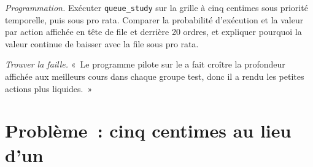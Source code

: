 \begin{exercise}[$\star\star\star$]\label{exo:mx:tick-size-queues-and-priority:7}
\emph{Programmation.} Exécuter \texttt{queue\_study} sur la grille à cinq centimes sous priorité temporelle, puis sous pro rata. Comparer la probabilité d'exécution et la valeur par
action affichée en tête de file et derrière 20 ordres, et expliquer pourquoi la valeur continue de baisser avec la file sous pro rata.
\end{exercise}

\begin{exercise}[$\star\star\star$]\label{exo:mx:tick-size-queues-and-priority:8}
\emph{Trouver la faille.} «~Le programme pilote sur le  a fait croître la profondeur affichée aux meilleurs cours dans chaque groupe test, donc il a rendu les petites actions plus liquides.~»
\end{exercise}

\section{Problème~: cinq centimes au lieu d'un}


